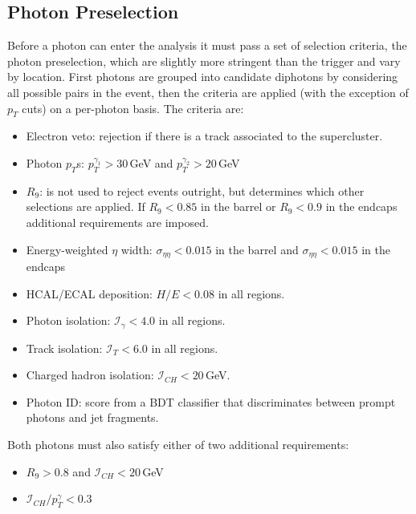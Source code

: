 \subsection{Photon Preselection}
Before a photon can enter the analysis it must pass a set of selection criteria, the photon preselection, which are slightly more stringent than the trigger and vary by location. First photons are grouped into candidate diphotons by considering all possible pairs in the event, then the criteria are applied (with the exception of $p_{T}$ cuts) on a per-photon basis.
The criteria are:
\begin{itemize}[noitemsep]
    \item Electron veto: rejection if there is a track associated to the supercluster.
    \item Photon $p_{T}$s: $p_{T}^{\gamma_1} > 30$\,GeV and $p_{T}^{\gamma_2} > 20$\,GeV
    \item $R_{9}$: is not used to reject events outright, but determines which other selections are applied. If $R_{9} < 0.85$ in the barrel or $R_{9} < 0.9$ in the endcaps additional requirements are imposed. 
    \item Energy-weighted $\eta$ width: $\sigma_{\eta\eta} < 0.015$ in the barrel and $\sigma_{\eta\eta} < 0.015$ in the endcaps
    \item HCAL/ECAL deposition: $H/E < 0.08$ in all regions.
    \item Photon isolation: $\mathcal{I}_{\gamma} < 4.0$ in all regions. 
    \item Track isolation: $\mathcal{I}_{T} < 6.0$ in all regions.
    \item Charged hadron isolation: $\mathcal{I}_{CH} < 20$\,GeV.
    \item Photon ID: score from a BDT classifier that discriminates between prompt photons and jet fragments.
\end{itemize}
Both photons must also satisfy either of two additional requirements:
\begin{itemize}[noitemsep]
    \item $R_{9} > 0.8$ and $\mathcal{I}_{CH} < 20$\,GeV
    \item $\mathcal{I}_{CH}/p_{T}^{\gamma} < 0.3$
\end{itemize}

